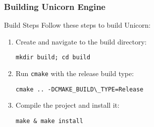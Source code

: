 \begin{frame}[fragile]
\frametitle{Building Unicorn Engine}

\begin{block}{Build Steps}
    Follow these steps to build Unicorn:
    \begin{enumerate}
        \item Create and navigate to the build directory:
        \begin{verbatim}
mkdir build; cd build
        \end{verbatim}
        \item Run \texttt{cmake} with the release build type:
        \begin{verbatim}
cmake .. -DCMAKE_BUILD\_TYPE=Release
        \end{verbatim}
        \item Compile the project and install it:
        \begin{verbatim}
make & make install
        \end{verbatim}

    \end{enumerate}
\end{block}
\end{frame}
